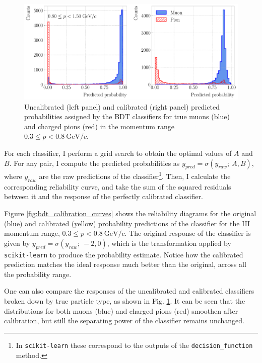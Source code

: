 \begin{figure}[t]
	\centering
	\includegraphics[width=.95\linewidth]{Images/GArSoft_PID/BDT/ecal_bdt_output_example_calibration.pdf}
	\caption{Uncalibrated (left panel) and calibrated (right panel) predicted probabilities assigned by the BDT classifiers for true muons (blue) and charged pions (red) in the momentum range $0.3 \leq p < 0.8 ~ \mathrm{GeV}/c$.}
	\label{fig:bdt_calibration_output}
\end{figure}

For each classifier, I perform a grid search to obtain the optimal values of $A$ and $B$. For any pair, I compute the predicted probabilities as $y_{pred} = \sigma(y_{raw};~A,B)$, where $y_{raw}$ are the raw predictions of the classifier\footnote{In \texttt{scikit-learn} these correspond to the outputs of the \texttt{decision_function} method.}. Then, I calculate the corresponding reliability curve, and take the sum of the squared residuals between it and the response of the perfectly calibrated classifier.

Figure \ref{fig:bdt_calibration_curves} shows the reliability diagrams for the original (blue) and calibrated (yellow) probability predictions of the classifier for the III momentum range, $0.3 \leq p < 0.8 ~ \mathrm{GeV}/c$. The original response of the classifier is given by $y_{pred} = \sigma(y_{raw};~-2,0)$, which is the transformation applied by \texttt{scikit-learn} to produce the probability estimate. Notice how the calibrated prediction matches the ideal response much better than the original, across all the probability range.

One can also compare the responses of the uncalibrated and calibrated classifiers broken down by true particle type, as shown in Fig. \ref{fig:bdt_calibration_output}. It can be seen that the distributions for both muons (blue) and charged pions (red) smoothen after calibration, but still the separating power of the classifier remains unchanged.

